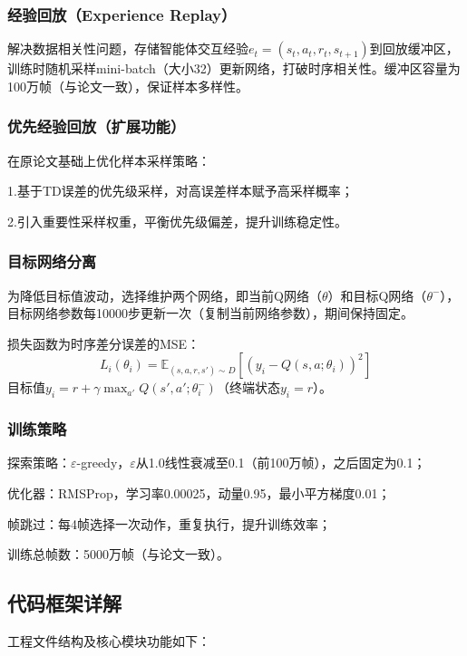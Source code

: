 \documentclass[conference]{IEEEtran}
\begin{document}
	\subsubsection{经验回放（Experience Replay）}
	解决数据相关性问题，存储智能体交互经验$e_t = (s_t, a_t, r_t, s_{t+1})$到回放缓冲区，训练时随机采样mini-batch（大小32）更新网络，打破时序相关性。缓冲区容量为100万帧（与论文一致），保证样本多样性。
	
	\subsubsection{优先经验回放（扩展功能）}
	在原论文基础上优化样本采样策略\cite{4}\cite{5}：
	
	1.基于TD误差的优先级采样，对高误差样本赋予高采样概率；
	
	2.引入重要性采样权重，平衡优先级偏差，提升训练稳定性。
	
	\subsubsection{目标网络分离}
	为降低目标值波动，选择维护两个网络，即当前Q网络（$\theta$）和目标Q网络（$\theta^-$），目标网络参数每10000步更新一次（复制当前网络参数），期间保持固定。
	
		损失函数为时序差分误差的MSE：
	\[
	L_i(\theta_i) = \mathbb{E}_{(s,a,r,s') \sim D} \left[ \left( y_i - Q(s,a;\theta_i) \right)^2 \right]
	\]
	目标值$y_i = r + \gamma \max_{a'} Q(s',a';\theta_i^-)$（终端状态$y_i = r$）。
	
	\subsubsection{训练策略}
	探索策略：$\varepsilon$-greedy，$\varepsilon$从1.0线性衰减至0.1（前100万帧），之后固定为0.1；
	
		优化器：RMSProp，学习率0.00025，动量0.95，最小平方梯度0.01；
	
		帧跳过：每4帧选择一次动作，重复执行，提升训练效率；
	
		训练总帧数：5000万帧（与论文一致）。
	
	\subsection{代码框架详解}
	工程文件结构及核心模块功能如下：
	
\end{document}
